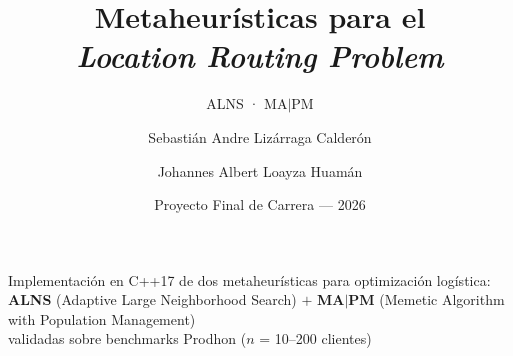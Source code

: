 \documentclass[aspectratio=169,10pt]{beamer}
\title[Metaheurísticas para el LRP]{%
  Metaheurísticas para el\\
  \textit{Location Routing Problem}}
\subtitle{ALNS · MA$|$PM}
\author[Lizárraga \& Loayza]{%
  Sebastián Andre Lizárraga Calderón \and
  Johannes Albert Loayza Huamán}
\date{Proyecto Final de Carrera --- 2026}
\begin{document}
\begin{frame}
  \titlepage
  \vspace{-0.8em}
  \begin{center}\small
    Implementación en C++17 de dos metaheurísticas para optimización logística:\\[0.2em]
    \textbf{ALNS} (Adaptive Large Neighborhood Search) \;$+$\;
    \textbf{MA$|$PM} (Memetic Algorithm with Population Management)\\[0.2em]
    validadas sobre benchmarks Prodhon ($n$ = 10--200 clientes)
  \end{center}
\end{frame}

\end{document}
